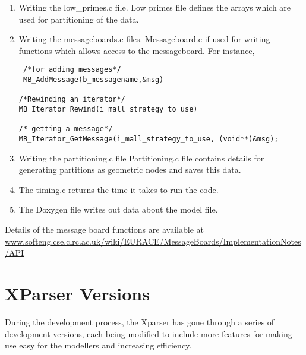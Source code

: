 \begin{enumerate}
\begin{itemize}
 \end{itemize}
 
 \item Writing the low\_primes.c file. Low primes file defines the arrays which are used for partitioning of the data.
 \item Writing the messageboards.c files. Messageboard.c if used for writing functions which allows access to the messageboard. For instance,\\
 
 \begin{mylisting}
\begin{verbatim}
 /*for adding messages*/
 MB_AddMessage(b_messagename,&msg) 

/*Rewinding an iterator*/
MB_Iterator_Rewind(i_mall_strategy_to_use)

/* getting a message*/
MB_Iterator_GetMessage(i_mall_strategy_to_use, (void**)&msg);
\end{verbatim}
\end{mylisting}

\item Writing the partitioning.c file Partitioning.c file contains details for generating partitions as geometric nodes and saves this data.
\item The timing.c returns the time it takes to run the code.
\item The Doxygen file writes out data about the model file.

\end{enumerate}

Details of the message board functions are available at \url{www.softeng.cse.clrc.ac.uk/wiki/EURACE/MessageBoards/ImplementationNotes/API}

\section{XParser Versions}

During the development process, the Xparser has gone through a series of development versions, each being modified to include more features for making use easy for the modellers and increasing efficiency.

